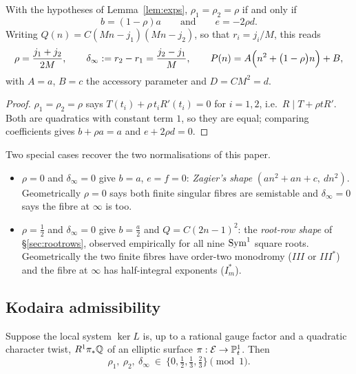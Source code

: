 \begin{theorem}\label{thm:norm}
\Proved{} With the hypotheses of Lemma~\ref{lem:exps}, $\rho_1=\rho_2=\rho$ if and
only if
\begin{equation}\label{eq:normclass}
b=(1-\rho)a\qquad\text{and}\qquad e=-2\rho d .
\end{equation}
Writing $Q(n)=C(Mn-j_1)(Mn-j_2)$, so that $r_i=j_i/M$, this reads
\[
\rho=\frac{j_1+j_2}{2M},\qquad
\delta_\infty:=r_2-r_1=\frac{j_2-j_1}{M},\qquad
P(n)=A\Bigl(n^2+\bigl(1-\rho\bigr)n\Bigr)+B ,
\]
with $A=a$, $B=c$ the accessory parameter and $D=CM^2=d$.
\end{theorem}

\begin{proof}
$\rho_1=\rho_2=\rho$ says $T(t_i)+\rho\,t_iR'(t_i)=0$ for $i=1,2$, i.e.\
$R\mid T+\rho tR'$. Both are quadratics with constant term $1$, so they are
equal; comparing coefficients gives $b+\rho a=a$ and $e+2\rho d=0$.
\end{proof}

Two special cases recover the two normalisations of this paper.
\begin{itemize}
\item $\rho=0$ and $\delta_\infty=0$ give $b=a$, $e=f=0$: \emph{Zagier's shape}
$(an^2+an+c,\ dn^2)$. Geometrically $\rho=0$ says both finite singular fibres are
semistable and $\delta_\infty=0$ says the fibre at $\infty$ is too.
\item $\rho=\tfrac12$ and $\delta_\infty=0$ give $b=\tfrac a2$ and
$Q=C(2n-1)^2$: the \emph{root-row shape} of \S\ref{sec:rootrows}, observed
empirically for all nine $\operatorname{Sym}^1$ square roots. Geometrically the two finite
fibres have order-two monodromy ($III$ or $III^*$) and the fibre at $\infty$ has
half-integral exponents ($I_m^*$).
\end{itemize}

\subsection{Kodaira admissibility}

\begin{theorem}\label{thm:kodaira}
\Proved{} Suppose the local system $\ker L$ is, up to a rational gauge factor and
a quadratic character twist, $R^1\pi_*\mathbb{Q}$ of an elliptic surface
$\pi:\mathcal E\to\mathbb{P}^1_t$. Then
\[
\rho_1,\ \rho_2,\ \delta_\infty\ \in\ \{0,\tfrac12,\tfrac13,\tfrac23\}\pmod 1 .
\]
\end{theorem}

